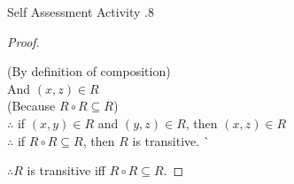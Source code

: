 \documentclass[../notes.tex]{subfiles}
\begin{document}
\begin{exercise}{Self Assessment Activity \thechapter.8}
\begin{enumerate}
\begin{proof}
\begin{enumerate}[label=(\roman*)]
\begin{subproof}[Subproof]
\begin{tabbing}
												\> (By definition of composition)\\
												And \> $(x, z) \in R$\\
												\> (Because $R \circ R \subseteq R$)\\
												$\therefore$ \> if $(x, y) \in R$ and $(y, z) \in R$, then $(x, z) \in R$\\
												$\therefore$ \> if $R \circ R \subseteq R$, then $R$ is transitive. \` \qedhere
											\end{tabbing}
										\end{subproof}
								\end{enumerate}
								$\therefore R$ is transitive iff $R \circ R \subseteq R$.
							\end{proof}
					\end{enumerate}
				\end{exercise}
\end{document}
